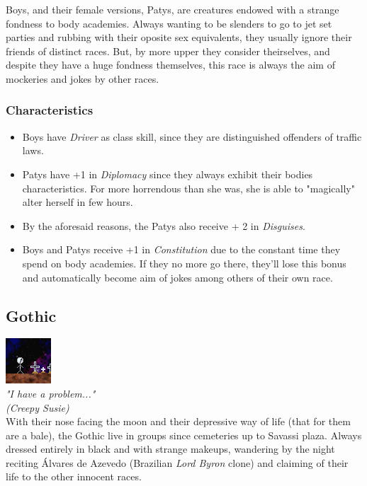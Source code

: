 \documentclass[ letterpaper,12pt]{article}
\begin{document}
Boys, and their female versions, Patys, are creatures endowed with a strange
fondness to body academies. Always wanting to be slenders to go to jet set
parties and rubbing with their oposite sex equivalents, they usually ignore
their friends of distinct races. But, by more upper they consider theirselves,
and despite they have a huge fondness themselves, this race is always the aim
of mockeries and jokes by other races.\\

\subsubsection{Characteristics}
\begin{itemize}
\item{Boys have {\it Driver} as class skill, since they are distinguished offenders of traffic laws.}
\item{Patys have +1 in {\it Diplomacy} since they always exhibit their bodies characteristics. For more horrendous than she was, she is able to "magically" alter herself in few hours.}
\item{By the aforesaid reasons, the Patys also receive + 2 in {\it Disguises}.}
\item{Boys and Patys receive +1 in {\it Constitution} due to the constant time they spend on body academies. If they no more go there, they'll lose this bonus and automatically become aim of jokes among others of their own race.}
\end{itemize}

\subsection{Gothic}
\includegraphics{../data/races/Img/gotico.png}\\
{\it "I have a problem..."
\\(Creepy Susie)}\\

With their nose facing the moon and their depressive way of life (that for them
are a bale), the Gothic live in groups since cemeteries up to Savassi plaza.
Always dressed entirely in black and with strange makeups, wandering by the
night reciting Álvares de Azevedo (Brazilian {\it Lord Byron} clone) and
claiming of their life to the other innocent races. 
\end{document}
